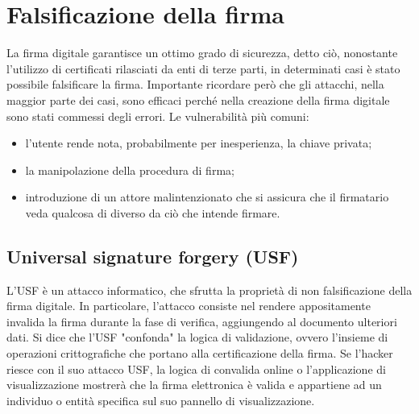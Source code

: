 \chapter{Falsificazione della firma}

La firma digitale garantisce un ottimo grado di sicurezza, detto ciò, nonostante l'utilizzo di certificati rilasciati da enti di terze parti, in determinati casi è stato possibile falsificare la firma.
Importante ricordare però che gli attacchi, nella maggior parte dei casi, sono efficaci perché nella creazione della firma digitale sono stati commessi degli errori. Le vulnerabilità più comuni:
\begin{itemize}
	\item l'utente rende nota, probabilmente per inesperienza, la chiave privata;
	\item la manipolazione della procedura di firma;
	\item introduzione di un attore malintenzionato che si assicura che il firmatario veda qualcosa di diverso da ciò che intende firmare.
\end{itemize}

\section{Universal signature forgery (USF)}

L'USF è un attacco informatico, che sfrutta la proprietà di non falsificazione della firma digitale. In particolare, l'attacco consiste nel rendere appositamente invalida la firma durante la fase di verifica, aggiungendo al documento ulteriori dati. Si dice che l'USF "confonda" la logica di validazione, ovvero l'insieme di operazioni crittografiche che portano alla certificazione della firma. 
Se l'hacker riesce con il suo attacco USF, la logica di convalida online o l'applicazione di visualizzazione mostrerà che la firma elettronica è valida e appartiene ad un individuo o entità specifica sul suo pannello di visualizzazione. 

